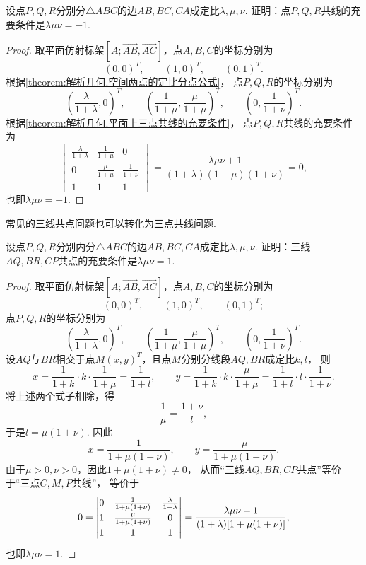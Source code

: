 \begin{example}[门内劳斯定理]
设点\(P,Q,R\)分别分\(\triangle ABC\)的边\(AB,BC,CA\)成定比\(\lambda,\mu,\nu\).
证明：点\(P,Q,R\)共线的充要条件是\(\lambda \mu \nu = -1\).
\begin{proof}
取平面仿射标架\([A;\vec{AB},\vec{AC}]\)，点\(A,B,C\)的坐标分别为\[
	(0,0)^T, \qquad
	(1,0)^T, \qquad
	(0,1)^T.
\]
根据\cref{theorem:解析几何.空间两点的定比分点公式}，
点\(P,Q,R\)的坐标分别为\[
	\left(\frac{\lambda}{1+\lambda},0\right)^T, \qquad
	\left(\frac{1}{1+\mu},\frac{\mu}{1+\mu}\right)^T, \qquad
	\left(0,\frac{1}{1+\nu}\right)^T.
\]
根据\cref{theorem:解析几何.平面上三点共线的充要条件}，
点\(P,Q,R\)共线的充要条件为\[
	\begin{vmatrix}
		\frac{\lambda}{1+\lambda} & \frac{1}{1+\mu} & 0 \\
		0 & \frac{\mu}{1+\mu} & \frac{1}{1+\nu} \\
		1 & 1 & 1
	\end{vmatrix}
	= \frac{\lambda \mu \nu + 1}{(1+\lambda)(1+\mu)(1+\nu)}
	= 0,
\]也即\(\lambda \mu \nu = -1\).
\end{proof}
\end{example}

常见的三线共点问题也可以转化为三点共线问题.

\begin{example}[切瓦定理]
设点\(P,Q,R\)分别内分\(\triangle ABC\)的边\(AB,BC,CA\)成定比\(\lambda,\mu,\nu\).
证明：三线\(AQ,BR,CP\)共点的充要条件是\(\lambda \mu \nu = 1\).
\begin{proof}
取平面仿射标架\([A;\vec{AB},\vec{AC}]\)，点\(A,B,C\)的坐标分别为\[
	(0,0)^T, \qquad
	(1,0)^T, \qquad
	(0,1)^T;
\]
点\(P,Q,R\)的坐标分别为\[
	\left(\frac{\lambda}{1+\lambda},0\right)^T, \qquad
	\left(\frac{1}{1+\mu},\frac{\mu}{1+\mu}\right)^T, \qquad
	\left(0,\frac{1}{1+\nu}\right)^T.
\]
设\(AQ\)与\(BR\)相交于点\(M(x,y)^T\)，且点\(M\)分别分线段\(AQ,BR\)成定比\(k,l\)，
则\[
x = \frac{1}{1+k} \cdot k \cdot \frac{1}{1+\mu}
= \frac{1}{1+l}, \qquad
y = \frac{1}{1+k} \cdot k \cdot \frac{\mu}{1+\mu}
= \frac{1}{1+l} \cdot l \cdot \frac{1}{1+\nu}.
\]
将上述两个式子相除，得\[
\frac{1}{\mu}
= \frac{1+\nu}{l},
\]于是\(l = \mu(1+\nu)\).
因此\[
	x = \frac{1}{1+\mu(1+\nu)}, \qquad
	y = \frac{\mu}{1+\mu(1+\nu)}.
\]
由于\(\mu>0,\nu>0\)，因此\(1+\mu(1+\nu)\neq0\)，
从而“三线\(AQ,BR,CP\)共点”等价于“三点\(C,M,P\)共线”，
等价于\[
	0 = \def\arraystretch{1.2} \begin{vmatrix}
		0 & \frac{1}{1+\mu(1+\nu)} & \frac{\lambda}{1+\lambda} \\
		1 & \frac{\mu}{1+\mu(1+\nu)} & 0 \\
		1 & 1 & 1
	\end{vmatrix}
	= \frac{\lambda \mu \nu - 1}{(1+\lambda) [1+\mu(1+\nu)]},
\]
也即\(\lambda \mu \nu = 1\).
\end{proof}
\end{example}

